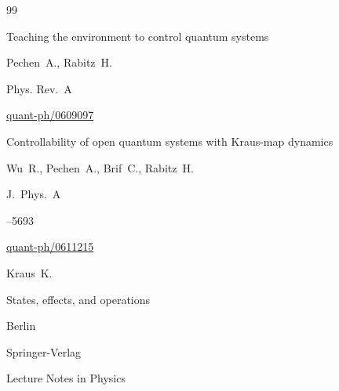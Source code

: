 \begin{thebibliography}{99}

\paper Teaching the environment to control quantum systems

\by Pechen~A., Rabitz~H.

\jour Phys. Rev.~A






\arxiv \href{http://arxiv.org/abs/quant-ph/0609097}{quant-ph/0609097}




\paper Controllability of open quantum systems with Kraus-map dynamics

\by Wu~R., Pechen~A., Brif~C., Rabitz~H.

\jour J.~Phys.~A




--5693

\arxiv \href{http://arxiv.org/abs/quant-ph/0611215}{quant-ph/0611215}






\by Kraus~K.

\book States, effects, and operations

\publaddr Berlin

\publ Springer-Verlag



\serial Lecture Notes in Physics






\end{thebibliography}



\noindent

\hskip6.5cm \thedate \par\noindent

\hskip6.5cm\therevdate\par







\makeengtitlem



\renewcommand{\baselinestretch}{0.9}



\newpage



%

